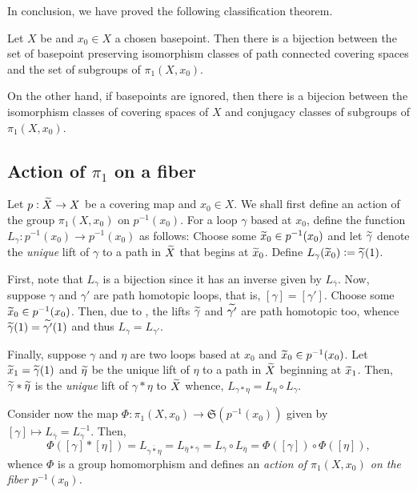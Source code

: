 In conclusion, we have proved the following classification theorem.

\begin{theorem}
    Let $X$ be \nice and $x_0\in X$ a chosen basepoint. Then there is a bijection between the set of basepoint preserving isomorphism classes of path connected covering spaces and the set of subgroups of $\pi_1(X,x_0)$. 

    On the other hand, if basepoints are ignored, then there is a bijecion between the isomorphism classes of covering spaces of $X$ and conjugacy classes of subgroups of $\pi_1(X,x_0)$.
\end{theorem}

\subsection{Action of \texorpdfstring{$\pi_1$}{fg} on a fiber}

Let $p:\widetilde{X}\to X$ be a covering map and $x_0\in X$. We shall first define an action of the group $\pi_1(X,x_0)$ on $p^{-1}(x_0)$. For a loop $\gamma$ based at $x_0$, define the function $L_\gamma: p^{-1}(x_0)\to p^{-1}(x_0)$ as follows: Choose some $\widetilde{x}_0\in p^{-1}(x_0)$ and let $\widetilde{\gamma}$ denote the \emph{unique} lift of $\gamma$ to a path in $\widetilde{X}$ that begins at $\widetilde{x}_0$. Define $L_\gamma(\widetilde{x}_0) := \widetilde{\gamma}(1)$.

First, note that $L_\gamma$ is a bijection since it has an inverse given by $L_{\overline\gamma}$. Now, suppose $\gamma$ and $\gamma'$ are path homotopic loops, that is, $[\gamma] = [\gamma']$. Choose some $\widetilde{x}_0\in p^{-1}(x_0)$. Then, due to , the lifts $\widetilde{\gamma}$ and $\widetilde{\gamma'}$ are path homotopic too, whence $\widetilde{\gamma}(1) = \widetilde{\gamma'}(1)$ and thus $L_{\gamma} = L_{\gamma'}$.

Finally, suppose $\gamma$ and $\eta$ are two loops based at $x_0$ and $\widetilde{x}_0\in p^{-1}(x_0)$. Let $\widetilde{x}_1 = \widetilde{\gamma}(1)$ and $\widetilde{\eta}$ be the unique lift of $\eta$ to a path in $\widetilde{X}$ beginning at $\widetilde{x}_1$. Then, $\widetilde{\gamma}\ast\widetilde{\eta}$ is the \emph{unique} lift of $\gamma\ast\eta$ to $\widetilde{X}$ whence, $L_{\gamma\ast\eta} = L_\eta\circ L_\gamma$. 

Consider now the map $\Phi:\pi_1(X,x_0)\to\mathfrak S\left(p^{-1}(x_0)\right)$ given by $[\gamma]\mapsto L_{\overline\gamma} = L_\gamma^{-1}$. Then, 
\begin{equation*}
    \Phi([\gamma]\ast[\eta]) = L_{\overline{\gamma\ast\eta}} = L_{\overline\eta\ast\overline\gamma} = L_{\overline\gamma}\circ L_{\overline\eta} = \Phi([\gamma])\circ\Phi([\eta]),
\end{equation*}
whence $\Phi$ is a group homomorphism and defines an \emph{action of $\pi_1(X,x_0)$ on the fiber $p^{-1}(x_0)$.}


